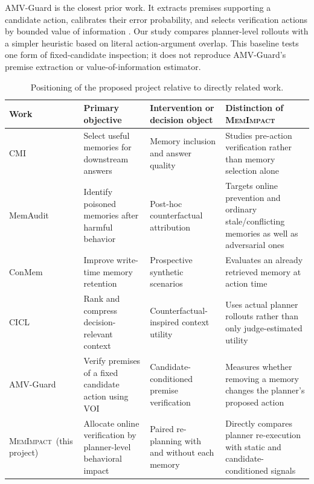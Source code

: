 \documentclass[11pt]{article}
\newcommand{\method}{\textsc{MemImpact}}
\begin{document}
AMV-Guard is the closest prior work. It extracts premises supporting a candidate action, calibrates their error probability, and selects verification actions by bounded value of information \cite{wang2026amv}. Our study compares planner-level rollouts with a simpler heuristic based on literal action-argument overlap. This baseline tests one form of fixed-candidate inspection; it does not reproduce AMV-Guard's premise extraction or value-of-information estimator.

\begin{table}[t]
\centering
\small
\caption{Positioning of the proposed project relative to directly related work.}
\label{tab:related}
\begin{tabularx}{\textwidth}{>{\raggedright\arraybackslash}p{} >{\raggedright\arraybackslash}p{} >{\raggedright\arraybackslash}p{} >{\raggedright\arraybackslash}X}
\toprule
\textbf{Work} & \textbf{Primary objective} & \textbf{Intervention or decision object} & \textbf{Distinction of \method} \\
\midrule
CMI \cite{srivastava2026cmi} & Select useful memories for downstream answers & Memory inclusion and answer quality & Studies pre-action verification rather than memory selection alone \\
MemAudit \cite{tan2026memaudit} & Identify poisoned memories after harmful behavior & Post-hoc counterfactual attribution & Targets online prevention and ordinary stale/conflicting memories as well as adversarial ones \\
ConMem \cite{zhang2026conmem} & Improve write-time memory retention & Prospective synthetic scenarios & Evaluates an already retrieved memory at action time \\
CICL \cite{guan2026cicl} & Rank and compress decision-relevant context & Counterfactual-inspired context utility & Uses actual planner rollouts rather than only judge-estimated utility \\
AMV-Guard \cite{wang2026amv} & Verify premises of a fixed candidate action using VOI & Candidate-conditioned premise verification & Measures whether removing a memory changes the planner's proposed action \\
\midrule
\method\ (this project) & Allocate online verification by planner-level behavioral impact & Paired re-planning with and without each memory & Directly compares planner re-execution with static and candidate-conditioned signals \\
\bottomrule
\end{tabularx}
\end{table}
\end{document}
